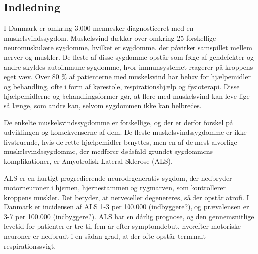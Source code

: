 \subsection{Indledning}


I Danmark er omkring 3.000 mennesker diagnosticeret med en muskelsvindssygdom. Muskelsvind dækker over omkring 25 forskellige neuromuskulære sygdomme, hvilket er sygdomme, der påvirker samspillet mellem nerver og muskler. De fleste af disse sygdomme opstår som følge af gendefekter og andre skyldes autoimmune sygdomme, hvor immunsystemet reagerer på kroppens eget væv. Over 80 \% af patienterne med muskelsvind har behov for hjælpemidler og behandling, ofte i form af kørestole, respirationshjælp og fysioterapi. Disse hjælpemidlerne og behandlingsformer gør, at flere med muskelsvind kan leve lige så længe, som andre kan, selvom sygdommen ikke kan helbredes. \citep{hvadermuskelsvind2016,sygdomsbeskrivelser2016}

De enkelte muskelsvindssygdomme er forskellige, og der er derfor forskel på udviklingen og konsekvenserne af dem. De fleste muskelsvindssygdomme er ikke livstruende, hvis de rette hjælpemidler benyttes, men en af de mest alvorlige muskelsvindssygdomme, der medfører dødsfald grundet sygdommens komplikationer, er Amyotrofisk Lateral Sklerose (ALS).  \citep{hvadermuskelsvind2016}

ALS er en hurtigt progredierende neurodegenerativ sygdom, der nedbryder motorneuroner i hjernen, hjernestammen og rygmarven, som kontrollerer kroppens muskler. Det betyder, at nerveceller degenereres, så der opstår atrofi. I Danmark er incidensen af ALS 1-3 per 100.000 (indbyggere?), og prævalensen er 3-7 per 100.000 (indbyggere?). ALS har en dårlig prognose, og den gennemsnitlige levetid for patienter er tre til fem år efter symptomdebut, hvorefter motoriske neuroner er nedbrudt i en sådan grad, at der ofte opstår terminalt respirationssvigt. \citep{russell2015, morris2015}

